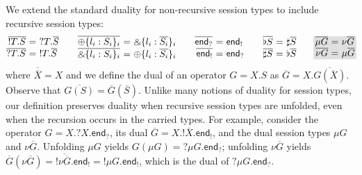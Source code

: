 \documentclass[orivec,envcountsame]{llncs}
\makeatletter
\newcommand{\with}{\mathbin\binampersand}
\newcommand{\gvdual}[1]{\overline{#1}}
\newcommand{\gvout}[2]{{!#1.#2}}
\newcommand{\gvin}[2]{{?#1.#2}}
\newcommand{\outterm}{\mkwd{end}_!}
\newcommand{\interm}{\mkwd{end}_?}
\newcommand{\gvserver}[1]{\flat #1}
\newcommand{\gvservice}[1]{\sharp #1}
\newcommand{\mkwd}[1]{\mathsf{#1}}
\newcommand{\ba}{\begin{array}}
\newcommand{\ea}{\end{array}}
\newenvironment{eqs}{\ba{@{}r@{~}c@{~}l@{}}}{\ea}
\newcommand\shaderow{\noalign{\vskip-0.4pt}\rowcolor{shade}[0.6mm]}
\makeatother
\begin{document}
We extend the standard duality for non-recursive session types to include recursive session types:
\small\[
\ba{@{}c@{\qquad}c@{\qquad}c@{\qquad}c@{\qquad}c@{}}
\begin{eqs}
\gvdual{\gvout{T}{S}} &=& \gvin{T}{\gvdual{S}} \\
\gvdual{\gvin{T}{S}} &=& \gvout{T}{\gvdual{S}} \\
\end{eqs}
&
\begin{eqs}
  \gvdual{\oplus \{ l_i: S_i \}_i} &=& \with \{ l_i : \gvdual{S_i} \}_i \\
  \gvdual{\with \{ l_i: S_i \}_i} &=& \oplus \{ l_i : \gvdual{S_i} \}_i \\
\end{eqs}
&
\begin{eqs}
  \gvdual{\interm} &=& \outterm \\
  \gvdual{\outterm} &=& \interm \\
\end{eqs}
&
\begin{eqs}
  \gvdual{\gvserver{S}} &=& \gvservice{\gvdual{S}} \\
  \gvdual{\gvservice{S}} &=& \gvserver{\gvdual{S}} \\
\end{eqs}
&
\begin{eqs}
  \shaderow \gvdual{\mu G} &=& \nu \gvdual{G} \\
  \shaderow \gvdual{\nu G} &=& \mu \gvdual{G}
\end{eqs}
\ea
\]\normalsize
where $\gvdual{\gvdual{X}} = X$ and we define the dual of an operator $G = X.S$ as $\gvdual{G} =
X.\gvdual{G(\gvdual{X})}.$ Observe that $\gvdual{G(S)} = \gvdual{G}(\gvdual{S})$.  Unlike many
notions of duality for session types, our definition preserves duality when recursive session types
are unfolded, even when the recursion occurs in the carried types.  For example, consider the
operator $G = X.\gvin{X}{\interm}$, its dual $\gvdual{G} = X.\gvout{\gvdual{X}}{\outterm}$, and the
dual session types $\mu G$ and $\nu \gvdual{G}$. Unfolding $\mu G$ yields $G(\mu G) =
\gvin{\mu G}{\interm}$; unfolding $\nu \gvdual{G}$ yields
  $\gvdual{G}(\nu \gvdual{G}) = \gvout{\gvdual{\nu \gvdual{G}}}{\outterm} = \gvout{\mu G}{\outterm}$,
which is the dual of $\gvin{\mu G}{\interm}$.
\end{document}
